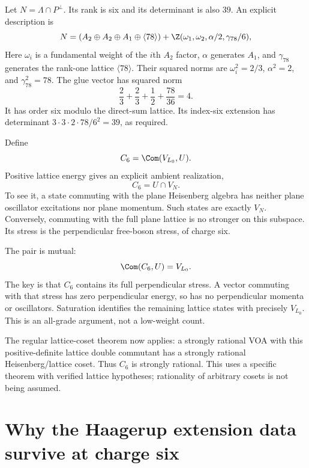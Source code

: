 Let $N=\Lambda\cap P^\perp$. Its rank is six and its determinant
is also $39$. An explicit description is
\begin{equation}\label{eq:c-rank6-lattice}
 N=(A_2\oplus A_2\oplus A_1\oplus\langle78\rangle)
        +\Z(\omega_1,\omega_2,\alpha/2,\gamma_{78}/6),
\end{equation}
Here $\omega_i$ is a fundamental weight of the $i$th $A_2$ factor,
$\alpha$ generates $A_1$, and $\gamma_{78}$ generates the rank-one
lattice $\langle78\rangle$. Their squared norms are
$\omega_i^2=2/3$, $\alpha^2=2$, and $\gamma_{78}^2=78$.
The glue vector has squared norm
\[
 \frac23+\frac23+\frac12+\frac{78}{36}=4.
\]
It has order six modulo the direct-sum lattice. Its index-six
extension has determinant
$3\cdot3\cdot2\cdot78/6^2=39$, as required.

Define
\begin{equation}\label{eq:c-C6}
 C_6=\Com(V_{L_0},U).
\end{equation}
Positive lattice energy gives an explicit ambient realization,
\[
 C_6=U\cap V_N.
\]
To see it, a state commuting with the plane Heisenberg algebra has
neither plane oscillator excitations nor plane momentum. Such states
are exactly $V_N$. Conversely, commuting with the full plane lattice
is no stronger on this subspace. Its stress is the perpendicular
free-boson stress, of charge six.

The pair is mutual:
\[
 \Com(C_6,U)=V_{L_0}.
\]
The key is that $C_6$ contains its full perpendicular stress. A vector
commuting with that stress has zero perpendicular energy, so has no
perpendicular momenta or oscillators. Saturation identifies the
remaining lattice states with precisely $V_{L_0}$. This is an
all-grade argument, not a low-weight count.

The regular lattice-coset theorem now applies: a strongly rational
VOA with this positive-definite lattice double commutant has a
strongly rational Heisenberg/lattice coset. Thus $C_6$ is strongly
rational. This uses a specific theorem with verified lattice
hypotheses; rationality of arbitrary cosets is not being assumed.

\section{Why the Haagerup extension data survive at charge six}

